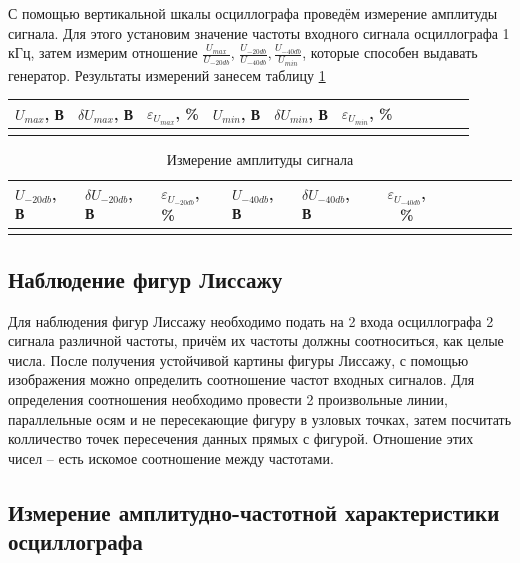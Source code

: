 \documentclass[a4paper,12pt]{article} %
\begin{document}
	С помощью вертикальной шкалы осциллографа проведём измерение амплитуды сигнала. Для этого установим значение частоты входного сигнала осциллографа 1 кГц, затем измерим отношение $ \frac{U_{max}}{U_{-20db}} $, $ \frac{U_{-20db}}{U_{-40db}} , \frac{U_{-40db}}{U_{min}}$, которые способен выдавать генератор. Результаты измерений занесем  таблицу \ref{tab:my-table}
	
	\begin{table}[H]
		\centering
		\begin{tabular}{|p{2.1cm}|p{2.1cm}|p{2.1cm}|p{2.1cm}|p{2.1cm}|c|c|c|c|c|c|}
			\hline
			$ U_{max} $, В & $ \delta U_{max} $, В & $ \varepsilon_{U_{max}} $, \% & $ U_{min} $, В & $ \delta U_{min} $, В & $ \varepsilon_{U_{min}} $, \% \\ \hline
			 & &  &  &  &   \\ \hline
		\end{tabular}
	\end{table}	
	\vspace{-1cm}
	\begin{table}[H]
		\centering
		\begin{tabular}{|p{2cm}|p{2cm}|p{2cm}|p{2cm}|p{2cm}|c|c|c|c|c|c|}
			\hline
			$ U_{-20db} $, В & $ \delta U_{-20db} $, В & $ \varepsilon_{U_{-20db}} $, \% & $ U_{-40db} $, В & $ \delta U_{-40db} $, В & $ \varepsilon_{U_{-40db}} $, \% \\ \hline
			& &  &  &  &   \\ \hline
		\end{tabular}
		\caption{Измерение амплитуды сигнала}
		\label{tab:my-table}
	\end{table}	
	\newpage
	
	\subsection{Наблюдение фигур Лиссажу}
	
	Для наблюдения фигур Лиссажу необходимо подать на 2 входа осциллографа 2 	сигнала различной частоты, причём их частоты должны соотноситься, как целые числа. После получения устойчивой картины фигуры Лиссажу, с помощью изображения можно определить соотношение частот входных сигналов. Для определения соотношения необходимо провести 2 произвольные линии, параллельные осям и не пересекающие фигуру в узловых точках, затем посчитать колличество точек пересечения данных прямых с фигурой. Отношение этих чисел -- есть искомое соотношение между частотами.			
	
	
	\subsection{Измерение амплитудно-частотной характеристики осциллографа}
	
\end{document}
